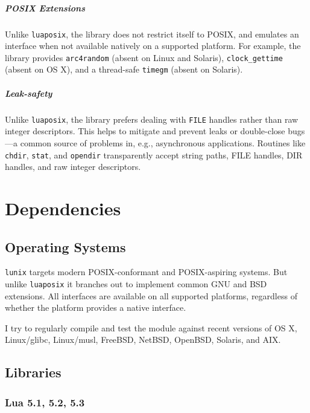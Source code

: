\documentclass[11pt, oneside]{memoir}
\newcommand*{\lunix}[0]{\texttt{lunix}\xspace}
\newcommand*{\luaposix}[0]{\texttt{luaposix}\xspace}
\newcommand*{\fn}[1]{\texttt{#1}\xspace}
\newcommand*{\const}[1]{\texttt{#1}\xspace}
\begin{document}
\paragraph{POSIX Extensions}

Unlike \luaposix, the library does not restrict itself to POSIX, and emulates an interface when not available natively on a supported platform. For example, the library provides \fn{arc4random} (absent on Linux and Solaris), \fn{clock\_gettime} (absent on OS X), and a thread-safe \fn{timegm} (absent on Solaris).

\paragraph{Leak-safety}

Unlike \luaposix, the library prefers dealing with \const{FILE} handles rather than raw integer descriptors. This helps to mitigate and prevent leaks or double-close bugs---a common source of problems in, e.g., asynchronous applications. Routines like \fn{chdir}, \fn{stat}, and \fn{opendir} transparently accept string paths, FILE handles, DIR handles, and raw integer descriptors.

\chapter{Dependencies}

\section{Operating Systems}

\lunix targets modern POSIX-conformant and POSIX-aspiring systems. But unlike \texttt{luaposix} it branches out to implement common GNU and BSD extensions. All interfaces are available on all supported platforms, regardless of whether the platform provides a native interface.

I try to regularly compile and test the module against recent versions of OS X, Linux/glibc, Linux/musl, FreeBSD, NetBSD, OpenBSD, Solaris, and AIX.

\section{Libraries}

\subsection{Lua 5.1, 5.2, 5.3}
\end{document}
